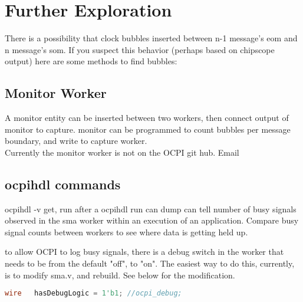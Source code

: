 \section{Further Exploration}

There is a possibility that clock bubbles inserted between n-1 message's eom and n message's som.  If you suspect this behavior (perhaps based on chipscope output) here are some methods to find bubbles:

\subsection{Monitor Worker}
A monitor entity can be inserted between two workers, then connect output of monitor to capture.  monitor can be programmed to count bubbles per message boundary, and write to capture worker.\\

Currently the monitor worker is not on the OCPI git hub.  Email \\

\subsection{ocpihdl commands}
ocpihdl -v get, run after a ocpihdl run can dump can tell number of busy signals observed in the sma worker within an execution of an application.  Compare busy signal counts between workers to see where data is getting held up.

to allow OCPI to log busy signals, there is a debug switch in the worker that needs to be from the default "off", to "on".  The easiest way to do this, currently, is to modify sma.v, and rebuild.  See below for the modification.

\begin{lstlisting}[language=verilog]
  wire 	 hasDebugLogic = 1'b1; //ocpi_debug;
\end{lstlisting}



